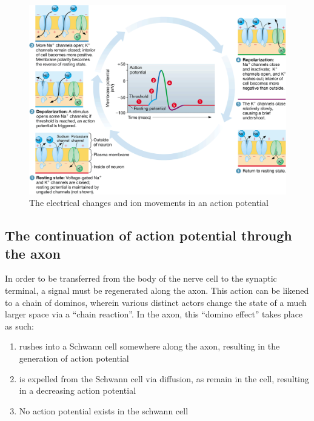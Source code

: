 \documentclass{article}
\begin{document}
\begin{figure}[h]
	\centering
	\includegraphics[width=0.8\linewidth]{depolarization.png}
	\caption{The electrical changes and ion movements in an action potential}
\end{figure}

\subsection{The continuation of action potential through the axon}

In order to be transferred from the body of the nerve cell to the synaptic
terminal, a signal must be regenerated along the axon. This action can be
likened to a chain of dominos, wherein various distinct actors change the
state of a much larger space via a ``chain reaction''. In the axon, this
``domino effect'' takes place as such:

\begin{enumerate}
	\item {} rushes into a Schwann cell somewhere along the axon,
		resulting in the generation of action potential
	\item {} is expelled from the Schwann cell via diffusion, as 
		remain in the cell, resulting in a decreasing action potential
	\item No action potential exists in the schwann cell
\end{enumerate}
\end{document}
